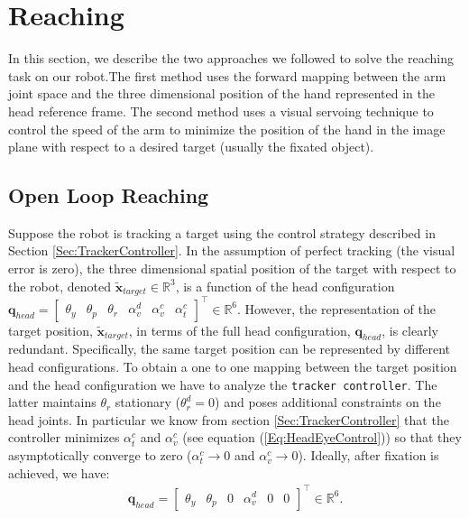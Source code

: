 \section{Reaching}
\label{sec:reaching}

In this section, we describe the two approaches we followed to solve
the reaching task on our robot.The first method 
uses the forward mapping between the arm joint space and the three 
dimensional position of the hand represented in the head reference 
frame. The second method uses a visual servoing technique to control the 
speed of the arm to minimize the position of the hand in the 
image plane with respect to a desired target (usually the fixated object).

\subsection{Open Loop Reaching}
%
Suppose the robot is tracking a target using the control strategy described in 
Section \ref{Sec:TrackerController}. In the assumption of perfect 
tracking (the visual error is zero), the three dimensional spatial position 
of the target with respect to the robot, denoted $\tilde {\mathbf x}_{target} 
\in \mathbb R^3$, 
is a function of the head configuration $\mathbf q_{head} =
\begin{bmatrix} \theta_y & \theta_p & \theta_r & \alpha_v^d & \alpha_v^c & \alpha_t^c \end{bmatrix}^\top \in \mathbb R^6$.
However, the representation of the target position, 
$\tilde {\mathbf x}_{target}$, in terms of the full head configuration, 
$\mathbf q_{head}$, is clearly redundant.
Specifically, the same target position can be represented by different 
head configurations. To obtain a one to one mapping between the target 
position and the head configuration we have to analyze the 
{\tt tracker controller}. The latter maintains $\theta_r$ stationary 
($\theta_r^d = 0$) and poses additional constraints on the head joints. 
In particular we know from section \ref{Sec:TrackerController} that the 
controller minimizes $\alpha_t^c$ and $\alpha^c_v$ (see equation 
(\ref{Eq:HeadEyeControl})) so that they asymptotically
converge to zero ($\alpha_t^c \rightarrow 0$ and 
$\alpha_v^c \rightarrow 0$). Ideally, after 
fixation is achieved, we have:
%
\begin{eqnarray}
{\mathbf q}_{head}=
\begin{bmatrix} \theta_y & \theta_p & 0 & \alpha_v^d & 0 & 0 \end{bmatrix}^\top \in \mathbb R^6.
\end{eqnarray}
